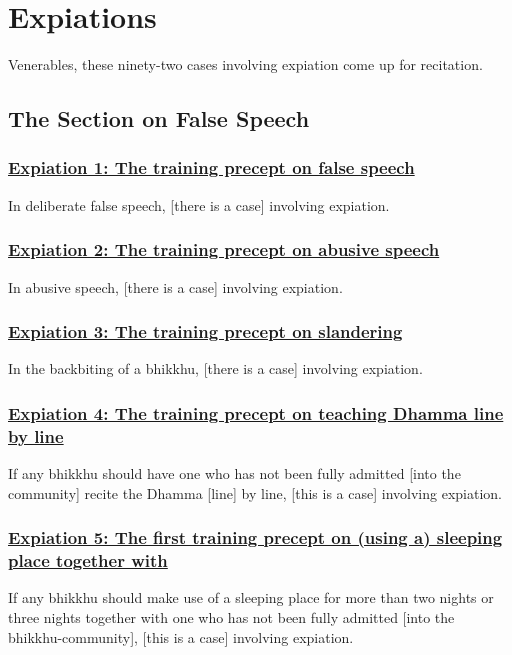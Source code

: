\section{Expiations}
\label{exp}

\begin{center}
  Venerables, these ninety-two cases involving expiation come up for recitation.
\end{center}

\setsubsecheadstyle{\subsectionFmt}
\subsection{The Section on False Speech}
\vspace{0.2cm}

\subsubsection*{\hyperref[pac1]{Expiation 1: The training precept on false speech}}
\label{exp1}
In deliberate false speech, [there is a case] involving expiation.

\subsubsection*{\hyperref[pac2]{Expiation 2: The training precept on abusive speech}}
\label{exp2}
In abusive speech, [there is a case] involving expiation.

\subsubsection*{\hyperref[pac3]{Expiation 3: The training precept on slandering}}
\label{exp3}
In the backbiting of a bhikkhu, [there is a case] involving expiation.

\subsubsection*{\hyperref[pac4]{Expiation 4: The training precept on teaching Dhamma line by line}}
\label{exp4}
If any bhikkhu should have one who has not been fully admitted [into the community] recite the Dhamma [line] by line, [this is a case] involving expiation.

\subsubsection*{\hyperref[pac5]{Expiation 5: The first training precept on (using a) sleeping place together with}}
\label{exp5}
If any bhikkhu should make use of a sleeping place for more than two nights or three nights together with one who has not been fully admitted [into the bhikkhu-community], [this is a case] involving expiation.

